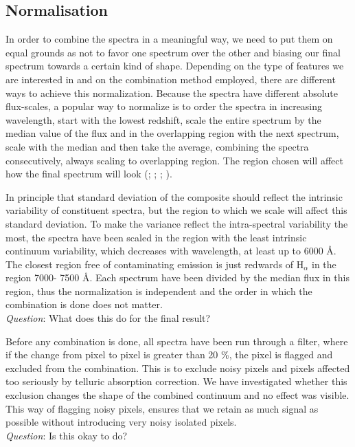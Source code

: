 \documentclass{aa}    %
\newcommand{\sectlabel}[1]{\label{sect:#1}}
\newcommand{\todo}[3]{{\color{#2}\emph{#1}: #3}}
\newcommand{\qtodo}[1]{\todo{\\ Question}{red}{#1}}
\begin{document}
\subsection{Normalisation}  \sectlabel{norm}

In order to combine the spectra in a meaningful way, we need to put them on equal grounds as not to favor one spectrum over the other and biasing our final spectrum towards a certain kind of shape. Depending on the type of features we are interested in and on the combination method employed, there are different ways to achieve this normalization. Because the spectra have different absolute flux-scales, a popular way to normalize is to order the spectra in increasing wavelength, start with the lowest redshift, scale the entire spectrum by the median value of the flux and in the overlapping region with the next spectrum, scale with the median and then take the average, combining the spectra consecutively, always scaling to overlapping region. The region chosen will affect how the final spectrum will look (\cite{Francis1991}; \cite{Brotherton2000}; \cite{VandenBerk2001}; \cite{Glikman2006}).

 In principle that standard deviation of the composite should reflect the intrinsic variability of constituent spectra, but the region to which we scale will affect this standard deviation. To make the variance reflect the intra-spectral variability the most, the spectra have been scaled in the region with the least intrinsic continuum variability, which decreases with wavelength, at least up to 6000 \AA \citep{VandenBerk2004}. The closest region free of contaminating emission is just redwards of H$_\alpha$ in the region 7000- 7500 \AA. Each spectrum have been divided by the median flux in this region, thus the normalization is independent and the order in which the combination is done does not matter. \qtodo{What does this do for the final result?}

Before any combination is done, all spectra have been run through a filter, where if the change from pixel to pixel is greater than 20 \%, the pixel is flagged and excluded from the combination. This is to exclude noisy pixels and pixels affected too seriously by telluric absorption correction. We have investigated whether this exclusion changes the shape of the combined continuum and no effect was visible. This way of flagging noisy pixels, ensures that we retain as much signal as possible without introducing very noisy isolated pixels. \qtodo{Is this okay to do?}
\end{document}
